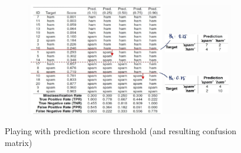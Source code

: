 \begin{figure}[H]
  \centering
  \begin{subfigure}{0.7\textwidth}
    \centering
    \includegraphics[width=\textwidth]{assets/sl/rocc__playing_threshold.jpg}
  \end{subfigure}

  \caption{Playing with prediction score threshold (and resulting confusion matrix)}
  \label{fig:7_ross_score_th}
\end{figure}

